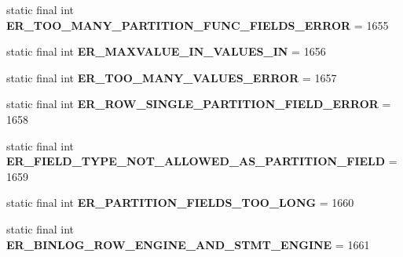 \begin{DoxyCompactItemize}
static final int {\bfseries E\+R\+\_\+\+T\+O\+O\+\_\+\+M\+A\+N\+Y\+\_\+\+P\+A\+R\+T\+I\+T\+I\+O\+N\+\_\+\+F\+U\+N\+C\+\_\+\+F\+I\+E\+L\+D\+S\+\_\+\+E\+R\+R\+OR} = 1655
\item 
\mbox{\label{classcom_1_1mysql_1_1cj_1_1exceptions_1_1_mysql_error_numbers_acbae0928ad35ac29f2282ab7df487625}} 
static final int {\bfseries E\+R\+\_\+\+M\+A\+X\+V\+A\+L\+U\+E\+\_\+\+I\+N\+\_\+\+V\+A\+L\+U\+E\+S\+\_\+\+IN} = 1656
\item 
\mbox{\label{classcom_1_1mysql_1_1cj_1_1exceptions_1_1_mysql_error_numbers_ac935da6375a4d3087ece141bc440f86d}} 
static final int {\bfseries E\+R\+\_\+\+T\+O\+O\+\_\+\+M\+A\+N\+Y\+\_\+\+V\+A\+L\+U\+E\+S\+\_\+\+E\+R\+R\+OR} = 1657
\item 
\mbox{\label{classcom_1_1mysql_1_1cj_1_1exceptions_1_1_mysql_error_numbers_a77aeb587370330c1ddcc4f9d3bc37575}} 
static final int {\bfseries E\+R\+\_\+\+R\+O\+W\+\_\+\+S\+I\+N\+G\+L\+E\+\_\+\+P\+A\+R\+T\+I\+T\+I\+O\+N\+\_\+\+F\+I\+E\+L\+D\+\_\+\+E\+R\+R\+OR} = 1658
\item 
\mbox{\label{classcom_1_1mysql_1_1cj_1_1exceptions_1_1_mysql_error_numbers_a041aaf04b74e8b5eb9885250b7536840}} 
static final int {\bfseries E\+R\+\_\+\+F\+I\+E\+L\+D\+\_\+\+T\+Y\+P\+E\+\_\+\+N\+O\+T\+\_\+\+A\+L\+L\+O\+W\+E\+D\+\_\+\+A\+S\+\_\+\+P\+A\+R\+T\+I\+T\+I\+O\+N\+\_\+\+F\+I\+E\+LD} = 1659
\item 
\mbox{\label{classcom_1_1mysql_1_1cj_1_1exceptions_1_1_mysql_error_numbers_a3d85df48ebdb1b0149709d0652bd8eb4}} 
static final int {\bfseries E\+R\+\_\+\+P\+A\+R\+T\+I\+T\+I\+O\+N\+\_\+\+F\+I\+E\+L\+D\+S\+\_\+\+T\+O\+O\+\_\+\+L\+O\+NG} = 1660
\item 
\mbox{\label{classcom_1_1mysql_1_1cj_1_1exceptions_1_1_mysql_error_numbers_ab249d3c53824004c0f5a76bd200ccef6}} 
static final int {\bfseries E\+R\+\_\+\+B\+I\+N\+L\+O\+G\+\_\+\+R\+O\+W\+\_\+\+E\+N\+G\+I\+N\+E\+\_\+\+A\+N\+D\+\_\+\+S\+T\+M\+T\+\_\+\+E\+N\+G\+I\+NE} = 1661

\end{DoxyCompactItemize}
